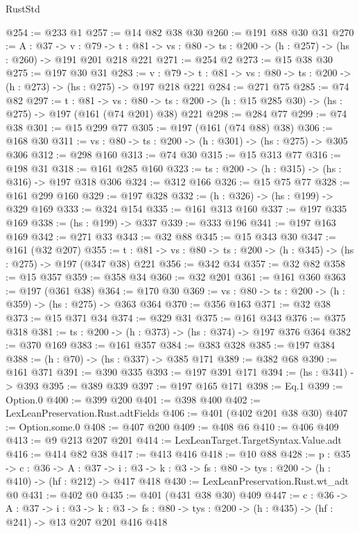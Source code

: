 \begin{lexlean}{RustStd}
\begin{coremodule}
{\begin{coremodule}
{{@254 := @233 @1
@257 := @14 @82 @38 @30
@260 := @191 @88 @30 @31
@270 := {A : @37} ->
  {v : @79} ->
  {t : @81} -> {vs : @80} -> {ts : @200} -> (h : @257) -> (hs : @260) -> @191 @201 @218 @221
@271 := @254 @2
@273 := @15 @38 @30
@275 := @197 @30 @31
@283 := {v : @79} ->
  {t : @81} -> {vs : @80} -> {ts : @200} -> (h : @273) -> (hs : @275) -> @197 @218 @221
@284 := @271 @75
@285 := @74 @82
@297 := {t : @81} ->
  {vs : @80} -> {ts : @200} -> (h : @15 @285 @30) -> (hs : @275) -> @197 (@161 (@74 @201) @38) @221
@298 := @284 @77
@299 := @74 @38
@301 := @15 @299 @77
@305 := @197 (@161 (@74 @88) @38)
@306 := @168 @30
@311 := {vs : @80} -> {ts : @200} -> (h : @301) -> (hs : @275) -> @305 @306
@312 := @298 @160
@313 := @74 @30
@315 := @15 @313 @77
@316 := @198 @31
@318 := @161 @285 @160
@323 := {ts : @200} -> (h : @315) -> (hs : @316) -> @197 @318 @306
@324 := @312 @166
@326 := @15 @75 @77
@328 := @161 @299 @160
@329 := @197 @328
@332 := (h : @326) -> (hs : @199) -> @329 @169
@333 := @324 @154
@335 := @161 @313 @160
@337 := @197 @335 @169
@338 := (hs : @199) -> @337
@339 := @333 @196
@341 := @197 @163 @169
@342 := @271 @33
@343 := @32 @88
@345 := @15 @343 @30
@347 := @161 (@32 @207)
@355 := {t : @81} -> {vs : @80} -> {ts : @200} -> (h : @345) -> (hs : @275) -> @197 (@347 @38) @221
@356 := @342 @34
@357 := @32 @82
@358 := @15 @357
@359 := @358 @34
@360 := @32 @201
@361 := @161 @360
@363 := @197 (@361 @38)
@364 := @170 @30
@369 := {vs : @80} -> {ts : @200} -> (h : @359) -> (hs : @275) -> @363 @364
@370 := @356 @163
@371 := @32 @38
@373 := @15 @371 @34
@374 := @329 @31
@375 := @161 @343
@376 := @375 @318
@381 := {ts : @200} -> (h : @373) -> (hs : @374) -> @197 @376 @364
@382 := @370 @169
@383 := @161 @357
@384 := @383 @328
@385 := @197 @384
@388 := (h : @70) -> (hs : @337) -> @385 @171
@389 := @382 @68
@390 := @161 @371
@391 := @390 @335
@393 := @197 @391 @171
@394 := (hs : @341) -> @393
@395 := @389 @339
@397 := @197 @165 @171
@398 := Eq.{1}
@399 := Option.{0}
@400 := @399 @200
@401 := @398 @400
@402 := LexLeanPreservation.Rust.adtFields
@406 := @401 (@402 @201 @38 @30)
@407 := Option.some.{0}
@408 := @407 @200
@409 := @408 @6
@410 := @406 @409
@413 := @9 @213 @207 @201
@414 := LexLeanTarget.TargetSyntax.Value.adt
@416 := @414 @82 @38
@417 := @413 @416
@418 := @10 @88
@428 := {p : @35} ->
  {c : @36} ->
  {A : @37} ->
  {i : @3} -> {k : @3} -> {fs : @80} -> {tys : @200} -> (h : @410) -> (hf : @212) -> @417 @418
@430 := LexLeanPreservation.Rust.wt_adt @0
@431 := @402 @0
@435 := @401 (@431 @38 @30) @409
@447 := {c : @36} ->
  {A : @37} ->
  {i : @3} ->
  {k : @3} -> {fs : @80} -> {tys : @200} -> (h : @435) -> (hf : @241) -> @13 @207 @201 @416 @418
}}
\end{coremodule}}
\end{coremodule}
\end{lexlean}
